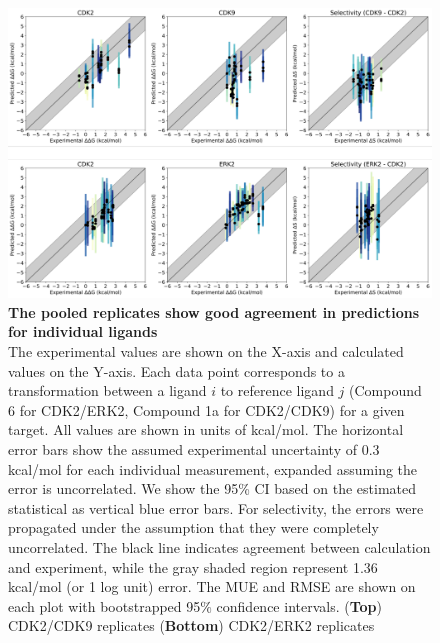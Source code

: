 \documentclass[phd,tocprelim]{cornell}
\begin{document}
\begin{appendices}
	\begin{landscape}
		\begin{figure}[p]
			\centering
			\includegraphics[width=0.7\linewidth]{figures/supp_figure8.pdf}
			\caption[The pooled replicates show good agreement in predictions for individual ligands]{
			{\bf The pooled replicates show good agreement in predictions for individual ligands} \\
The experimental values are shown on the X-axis and calculated values on the Y-axis. Each data point corresponds to a transformation between a ligand $i$ to reference ligand $j$ (Compound 6 for CDK2/ERK2, Compound 1a for CDK2/CDK9) for a given target. All values are shown in units of kcal/mol. The horizontal error bars show the assumed experimental uncertainty of 0.3 kcal/mol\citep{BROWN2009420} for each individual measurement, expanded assuming the error is uncorrelated. We show the 95\% CI based on the estimated statistical as vertical blue error bars. For selectivity, the errors were propagated under the assumption that they were completely uncorrelated. The black line indicates agreement between calculation and experiment, while the gray shaded region represent 1.36 kcal/mol (or 1 log unit) error. The MUE and RMSE are shown on each plot with bootstrapped 95$\%$ confidence intervals. ({\bf Top}) CDK2/CDK9 replicates ({\bf Bottom}) CDK2/ERK2 replicates
}
			\label{fig:sup-figure-8}
		\end{figure}
	\end{landscape}
	

\end{appendices}
\end{document}
